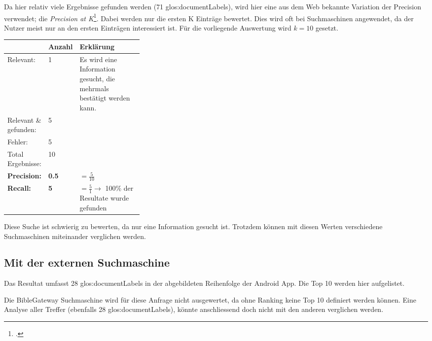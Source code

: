 Da hier relativ viele Ergebnisse gefunden werden (71 \glspl{glos:documentLabel}), wird hier eine aus dem Web bekannte Variation der Precision verwendet; die \textit{Precision at K}\footcite{Information_retrieval_Wikipedia_the_free_encyclopedia_2016-05-11}. Dabei werden nur die ersten K Einträge bewertet. Dies wird oft bei Suchmaschinen angewendet, da der Nutzer meist nur an den ersten Einträgen interessiert ist.
Für die vorliegende Auswertung wird $k = 10$ gesetzt.

\begin{table}[H]
	\centering
	\small\renewcommand{\arraystretch}{1.4}
	\begin{tabularx}{0.9\textwidth}{ L{0.22\linewidth} | L{0.1\linewidth} | X }%
		\hline
		& Anzahl & Erklärung \\ \hline \hline
		Relevant: & 1 & Es wird eine Information gesucht, die mehrmals bestätigt werden kann.\\
		Relevant \& gefunden: & 5 & \\
		Fehler: & 5 & \\
		Total Ergebnisse: & 10 & \\
		\hline
		\textbf{Precision:} & \textbf{0.5} & $= \frac{5}{10}$ \\
		\textbf{Recall:} & \textbf{5} & $= \frac{5}{1} \rightarrow$ 100\% der Resultate wurde gefunden\\
		\hline\hline
	\end{tabularx}
\end{table}

Diese Suche ist schwierig zu bewerten, da nur eine Information gesucht ist. Trotzdem können mit diesen Werten verschiedene Suchmaschinen miteinander verglichen werden.


\subsection{Mit der externen Suchmaschine}
Das Resultat umfasst 28 \glspl{glos:documentLabel} in der abgebildeten Reihenfolge der Android App.
Die Top 10 werden hier aufgelistet.

Die BibleGateway Suchmaschine wird für diese Anfrage nicht ausgewertet, da ohne Ranking keine Top 10 definiert werden können. Eine Analyse aller Treffer (ebenfalls 28 \glspl{glos:documentLabel}), könnte anschliessend doch nicht mit den anderen verglichen werden.

